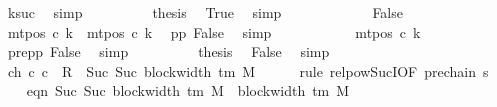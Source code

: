 \begin{isabellebody}
\ ksuc\ \isamarkupfalse%
\ simp\isanewline
\ \ \ \ \ \ \isamarkupfalse%
\ \isamarkupfalse%
\ {\isacharquery}{\kern0pt}thesis\ \isamarkupfalse%
\ True\ \isamarkupfalse%
\ simp\isanewline
\ \ \ \ \isamarkupfalse%
\isanewline
\ \ \ \ \ \ \isamarkupfalse%
\ False\isanewline
\ \ \ \ \ \ \isamarkupfalse%
\ {\isachardoublequoteopen}mt{\isacharunderscore}{\kern0pt}pos\ c{}\ k{\isacharprime}{\kern0pt}\ {\isacharequal}{\kern0pt}\ mt{\isacharunderscore}{\kern0pt}pos\ c{}\ k{\isacharprime}{\kern0pt}{\isachardoublequoteclose}\ \isamarkupfalse%
\ pp{}\ False\ \isamarkupfalse%
\ simp\isanewline
\ \ \ \ \ \ \isamarkupfalse%
\ \isamarkupfalse%
\ {\isachardoublequoteopen}{\isasymdots}\ {\isacharequal}{\kern0pt}\ mt{\isacharunderscore}{\kern0pt}pos\ c{\isacharprime}{\kern0pt}\ k{\isacharprime}{\kern0pt}{\isachardoublequoteclose}\ \isamarkupfalse%
\ pre{\isacharunderscore}{\kern0pt}pp\ False\ \isamarkupfalse%
\ simp\isanewline
\ \ \ \ \ \ \isamarkupfalse%
\ \isamarkupfalse%
\ {\isacharquery}{\kern0pt}thesis\ \isamarkupfalse%
\ False\ \isamarkupfalse%
\ simp\isanewline
\ \ \ \ \isamarkupfalse%
\isanewline
\ \ \isamarkupfalse%
\isanewline
\ \ \isamarkupfalse%
\ ch{}{}{\isacharcolon}{\kern0pt}\ {\isachardoublequoteopen}{\isacharparenleft}{\kern0pt}c{\isacharprime}{\kern0pt}{\isacharcomma}{\kern0pt}\ c{}{\isacharparenright}{\kern0pt}\ {\isasymin}\ R{\isacharprime}{\kern0pt}\ {\isacharcircum}{\kern0pt}{\isacharcircum}{\kern0pt}\ Suc\ {\isacharparenleft}{\kern0pt}Suc\ {\isacharparenleft}{\kern0pt}block{\isacharunderscore}{\kern0pt}width\ {\isacharparenleft}{\kern0pt}{\isasymGamma}{\isacharunderscore}{\kern0pt}tm\ M{\isacharparenright}{\kern0pt}{\isacharparenright}{\kern0pt}{\isacharparenright}{\kern0pt}{\isachardoublequoteclose}\isanewline
\ \ \ \ \isamarkupfalse%
\ {\isacharparenleft}{\kern0pt}rule\ relpow{\isacharunderscore}{\kern0pt}Suc{\isacharunderscore}{\kern0pt}I{\isacharbrackleft}{\kern0pt}OF\ pre{\isacharunderscore}{\kern0pt}chain\ s{}{\isacharbrackright}{\kern0pt}{\isacharparenright}{\kern0pt}\isanewline
\ \ \isamarkupfalse%
\ eqn{\isacharcolon}{\kern0pt}\ {\isachardoublequoteopen}Suc\ {\isacharparenleft}{\kern0pt}Suc\ {\isacharparenleft}{\kern0pt}block{\isacharunderscore}{\kern0pt}width\ {\isacharparenleft}{\kern0pt}{\isasymGamma}{\isacharunderscore}{\kern0pt}tm\ M{\isacharparenright}{\kern0pt}{\isacharparenright}{\kern0pt}{\isacharparenright}{\kern0pt}\ {\isacharequal}{\kern0pt}\ block{\isacharunderscore}{\kern0pt}width\ {\isacharparenleft}{\kern0pt}{\isasymGamma}{\isacharunderscore}{\kern0pt}tm\ M{\isacharparenright}{\kern0pt}\ {\isacharplus}{\kern0pt}\ {}{\isachardoublequoteclose}\ \isamarkupfalse%

\end{isabellebody}
